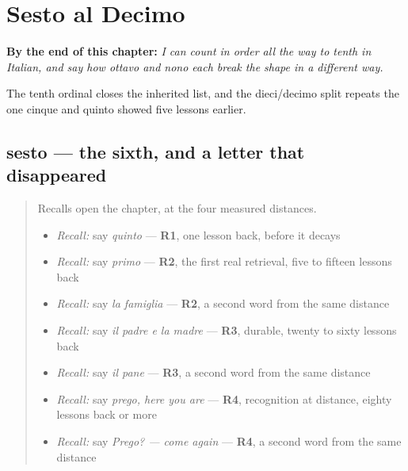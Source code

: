 
\chapter{Sesto al Decimo}
\label{ch:it-ordinali-al-decimo}

\begin{chapteropening}
\textbf{By the end of this chapter:} \emph{I can count in order all the way to tenth in Italian, and say how ottavo and nono each break the shape in a different way.}

The tenth ordinal closes the inherited list, and the dieci/decimo split repeats the one cinque and quinto showed five lessons earlier.
\end{chapteropening}

\section[sesto / sesta]{sesto — the sixth, and a letter that disappeared}

\label{lesson:IT-C27-sesto}



\begin{quote}
Recalls open the chapter, at the four measured distances.

\begin{itemize}
\raggedright
  \item \emph{Recall:} say \emph{quinto} — \textbf{R1}, one lesson back, before it decays
  \item \emph{Recall:} say \emph{primo} — \textbf{R2}, the first real retrieval, five to fifteen lessons back
  \item \emph{Recall:} say \emph{la famiglia} — \textbf{R2}, a second word from the same distance
  \item \emph{Recall:} say \emph{il padre e la madre} — \textbf{R3}, durable, twenty to sixty lessons back
  \item \emph{Recall:} say \emph{il pane} — \textbf{R3}, a second word from the same distance
  \item \emph{Recall:} say \emph{prego, here you are} — \textbf{R4}, recognition at distance, eighty lessons back or more
  \item \emph{Recall:} say \emph{Prego? — come again} — \textbf{R4}, a second word from the same distance
\end{itemize}
\end{quote}

